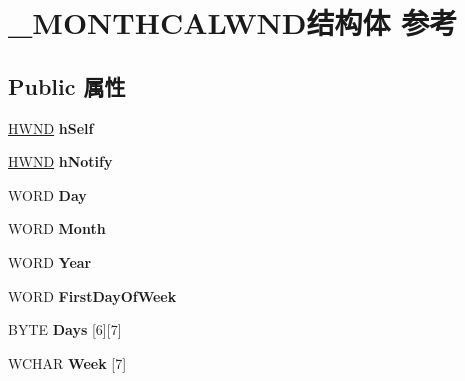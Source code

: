 \hypertarget{struct___m_o_n_t_h_c_a_l_w_n_d}{}\section{\+\_\+\+M\+O\+N\+T\+H\+C\+A\+L\+W\+N\+D结构体 参考}
\label{struct___m_o_n_t_h_c_a_l_w_n_d}
\subsection*{Public 属性}
\begin{DoxyCompactItemize}
\item 
\mbox{\label{struct___m_o_n_t_h_c_a_l_w_n_d_a5bdb0e09860cc3851f5ccd538a40a828}} 
\hyperlink{interfacevoid}{H\+W\+ND} {\bfseries h\+Self}
\item 
\mbox{\label{struct___m_o_n_t_h_c_a_l_w_n_d_af532cac2611ebdf0c49da9d47d886793}} 
\hyperlink{interfacevoid}{H\+W\+ND} {\bfseries h\+Notify}
\item 
\mbox{\label{struct___m_o_n_t_h_c_a_l_w_n_d_aaf3556ce4ea187ac77a40a9e8a80a5b6}} 
W\+O\+RD {\bfseries Day}
\item 
\mbox{\label{struct___m_o_n_t_h_c_a_l_w_n_d_a3429d51f0668640d0d64b1461cf4a9e0}} 
W\+O\+RD {\bfseries Month}
\item 
\mbox{\label{struct___m_o_n_t_h_c_a_l_w_n_d_ac8e9f315fe228e3285288cbd7840bb38}} 
W\+O\+RD {\bfseries Year}
\item 
\mbox{\label{struct___m_o_n_t_h_c_a_l_w_n_d_ac0fa550c0b3880217e0eba33f3e85d90}} 
W\+O\+RD {\bfseries First\+Day\+Of\+Week}
\item 
\mbox{\label{struct___m_o_n_t_h_c_a_l_w_n_d_a9a22aab2f499a771377dae7e42c00871}} 
B\+Y\+TE {\bfseries Days} \mbox{[}6\mbox{]}\mbox{[}7\mbox{]}
\item 
\mbox{\label{struct___m_o_n_t_h_c_a_l_w_n_d_a5fd1afff3dbfb81448bf650789bcc37f}} 
W\+C\+H\+AR {\bfseries Week} \mbox{[}7\mbox{]}

\end{DoxyCompactItemize}
